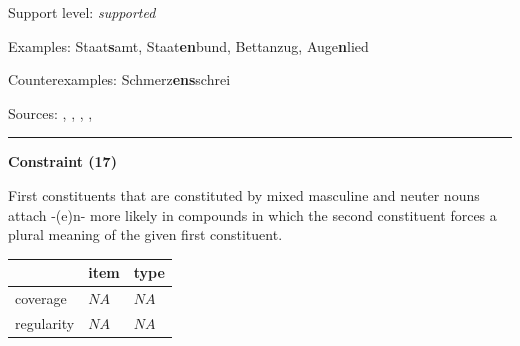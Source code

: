 \vspace{-1.35em}

\noindent
Support level: \textit{supported}

\vspace{0.3em}

\noindent
Examples: Staat\textbf{s}amt, Staat\textbf{en}bund, Bett{\zeroLinker}anzug, Auge\textbf{n}lied

\noindent
Counterexamples: Schmerz\textbf{ens}schrei

\vspace{0.3em}

\noindent
Sources: \citet[3]{krott_etal_2007}, \citet[80]{nuebling_szczepaniak_2013}, \citet[92]{ortner_mueller-bollhagen_1991}, \citet[229]{schaefer_2018}, \citet[9]{schaefer_pankratz_2018}

\vspace{0.35em}
\hrule




\vspace{0.4em}

\begin{center}
\textbf{Constraint (17)}
\end{center}

\noindent
First constituents that are constituted by mixed masculine and neuter nouns attach -(e)n- more likely in compounds in which the second constituent forces a plural meaning of the given first constituent.
\vspace{0.5em}


\vspace{-0.25em}

\begin{table}[!ht]
\begin{center}
\setlength{\extrarowheight}{1pt}
\begin{tabularx}{\columnwidth}{|X|X|X|}
\hline
 & item & type \\
\hline
 coverage & $NA$ & $NA$ \\
\hline
 regularity & $NA$ & $NA$ \\
\hline
\end{tabularx}
\end{center}
\end{table}

